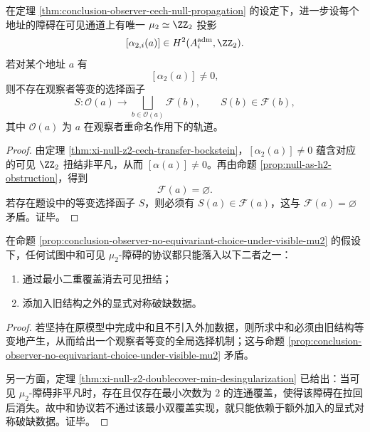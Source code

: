 \begin{proposition}[非平凡可见障碍上的等变选择不可能性]\label{prop:conclusion-observer-no-equivariant-choice-under-visible-mu2}
在定理 \ref{thm:conclusion-observer-cech-null-propagation} 的设定下，进一步设每个地址的障碍在可见通道上有唯一 \(\mu_2\simeq \ZZ_2\) 投影
\[
[\alpha_{2,i}(a)]\in H^2(A_i^{\mathrm{adm}},\ZZ_2).
\]
若对某个地址 \(a\) 有
\[
[\alpha_2(a)]\neq 0,
\]
则不存在观察者等变的选择函子
\[
S:\mathcal O(a)\longrightarrow \bigsqcup_{b\in\mathcal O(a)}\mathscr F(b),
\qquad
S(b)\in \mathscr F(b),
\]
其中 \(\mathcal O(a)\) 为 \(a\) 在观察者重命名作用下的轨道。
\end{proposition}
\begin{proof}
由定理 \ref{thm:xi-null-z2-cech-transfer-bockstein}，\([\alpha_2(a)]\neq 0\) 蕴含对应的可见 \(\ZZ_2\) 扭结非平凡，从而 \([\alpha(a)]\neq 0\)。再由命题 \ref{prop:null-as-h2-obstruction}，得到
\[
\mathscr F(a)=\varnothing.
\]
若存在题设中的等变选择函子 \(S\)，则必须有 \(S(a)\in \mathscr F(a)\)，这与 \(\mathscr F(a)=\varnothing\) 矛盾。证毕。
\end{proof}

\begin{corollary}\label{cor:conclusion-observer-visible-mu2-neutralization-dichotomy}
在命题 \ref{prop:conclusion-observer-no-equivariant-choice-under-visible-mu2} 的假设下，任何试图中和可见 \(\mu_2\)-障碍的协议都只能落入以下二者之一：
\begin{enumerate}
  \item 通过最小二重覆盖消去可见扭结；
  \item 添加入旧结构之外的显式对称破缺数据。
\end{enumerate}
\end{corollary}
\begin{proof}
若坚持在原模型中完成中和且不引入外加数据，则所求中和必须由旧结构等变地产生，从而给出一个观察者等变的全局选择机制；这与命题 \ref{prop:conclusion-observer-no-equivariant-choice-under-visible-mu2} 矛盾。

另一方面，定理 \ref{thm:xi-null-z2-doublecover-min-desingularization} 已给出：当可见 \(\mu_2\)-障碍非平凡时，存在且仅存在最小次数为 \(2\) 的连通覆盖，使得该障碍在拉回后消失。故中和协议若不通过该最小双覆盖实现，就只能依赖于额外加入的显式对称破缺数据。证毕。
\end{proof}

